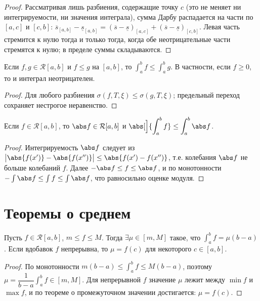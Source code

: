 \begin{proof}
Рассматривая лишь разбиения, содержащие точку $c$ (это не меняет ни интегрируемости, ни значения
интеграла), сумма Дарбу распадается на части по $[a,c]$ и $[c,b]$:
$\overline s_{[a,b]}-\underline s_{[a,b]}=(\overline s-\underline s)_{[a,c]}
+(\overline s-\underline s)_{[c,b]}$. Левая часть стремится к нулю тогда и только тогда, когда
обе неотрицательные части стремятся к нулю; в пределе суммы складываются.
\end{proof}

\begin{property}[монотонность]
Если $f,g\in\mathcal R[a,b]$ и $f\le g$ на $[a,b]$, то $\displaystyle\int_a^b f\le\int_a^b g$.
В частности, если $f\ge0$, то и интеграл неотрицателен.
\end{property}

\begin{proof}
Для любого разбиения $\sigma(f,T,\xi)\le\sigma(g,T,\xi)$; предельный переход сохраняет нестрогое
неравенство.
\end{proof}

\begin{property}
Если $f\in\mathcal R[a,b]$, то $\abs f\in\mathcal R[a,b]$ и
$\displaystyle\abs[\Big]{\int_a^b f}\le\int_a^b\abs f$.
\end{property}

\begin{proof}
Интегрируемость $\abs f$ следует из $\bigl|\abs{f(x')}-\abs{f(x'')}\bigr|\le\abs{f(x')-f(x'')}$,
т.е. колебания $\abs f$ не больше колебаний $f$. Далее $-\abs f\le f\le\abs f$, и по
монотонности $-\int\abs f\le\int f\le\int\abs f$, что равносильно оценке модуля.
\end{proof}

\section{Теоремы о среднем}

\begin{theorem}
Пусть $f\in\mathcal R[a,b]$, $m\le f\le M$. Тогда $\exists\mu\in[m,M]$ такое, что
$\displaystyle\int_a^b f=\mu(b-a)$. Если вдобавок $f$ непрерывна, то $\mu=f(c)$ для некоторого
$c\in[a,b]$.
\end{theorem}

\begin{proof}
По монотонности $m(b-a)\le\int_a^b f\le M(b-a)$, поэтому
$\mu=\dfrac{1}{b-a}\int_a^b f\in[m,M]$. Для непрерывной $f$ значение $\mu$ лежит между $\min f$ и
$\max f$, и по теореме о промежуточном значении достигается: $\mu=f(c)$.
\end{proof}

